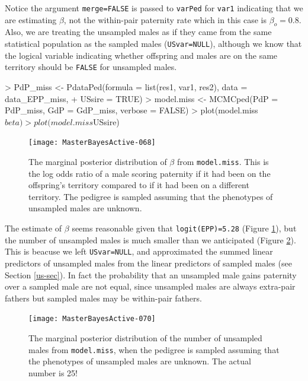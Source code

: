\documentclass{article}
\begin{document}
Notice the argument \texttt{merge=FALSE} is passed to \texttt{varPed} for \texttt{var1} indicating that we are estimating $\beta$,  not the within-pair paternity rate which in this case is $\beta_{o}=0.8$. Also, we are treating the unsampled males as if they came from the same statistical population as the sampled males (\texttt{USvar=NULL}), although we know that the logical variable indicating whether offspring and males are on the same territory should be \texttt{FALSE} for unsampled males.
  
\begin{Schunk}
\begin{Sinput}
> PdP_miss <- PdataPed(formula = list(res1, var1, res2), data = data_EPP_miss, 
+     USsire = TRUE)
> model.miss <- MCMCped(PdP = PdP_miss, GdP = GdP_miss, verbose = FALSE)
> plot(model.miss$beta)
> plot(model.miss$USsire)
\end{Sinput}
\end{Schunk}


\begin{figure}[!h]
\begin{center}
\texttt{[image: MasterBayesActive-068]}
\end{center}
\caption{The marginal posterior distribution of $\beta$ from \texttt{model.miss}.  This is the log odds ratio of a male scoring paternity if it had been on the offspring's territory compared to if it had been on a different territory. The pedigree is sampled assuming that the phenotypes of unsampled males are unknown.}
\label{EPP1-fig}
\end{figure}


The estimate of $\beta$ seems reasonable given that \texttt{logit(EPP)=5.28} (Figure \ref{EPP1-fig}), but the number of unsampled males is much smaller than we anticipated (Figure \ref{EPP1US-fig}).  This is beacuse we left \texttt{USvar=NULL}, and approximated the summed linear predictors of unsampled males from the linear predictors of sampled males (see Section \ref{us-sec}).  In fact the probability that an unsampled male gains paternity over a sampled male are not equal, since unsampled males are always extra-pair fathers but sampled males may be within-pair fathers.\\  


\begin{figure}[!h]
\begin{center}
\texttt{[image: MasterBayesActive-070]}
\end{center}
\caption{The marginal posterior distribution of the number of unsampled males from \texttt{model.miss}, when the pedigree is sampled assuming that the phenotypes of unsampled males are unknown. The actual number is 25!}
\label{EPP1US-fig}
\end{figure}
\end{document}
